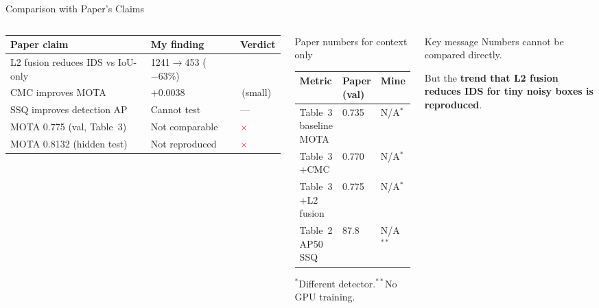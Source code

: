 \documentclass[aspectratio=169, 10pt]{beamer}
\newcommand{\yes}{\textcolor{green!60!black}{\textbf{\checkmark}}}
\newcommand{\no}{\textcolor{red}{\textbf{$\times$}}}
\begin{document}
\begin{frame}{Comparison with Paper's Claims}

  \begin{columns}[T]


    \begin{tabular}{p{3.8cm}p{2.0cm}p{1.0cm}}
      \toprule
      Paper claim & My finding & Verdict \\
      \midrule
      L2 fusion reduces IDS vs IoU-only &
        1241$\to$453 ($-63\%$) & \yes \\
      \addlinespace
      CMC improves MOTA &
        $+0.0038$ & \yes\,\small(small) \\
      \addlinespace
      SSQ improves detection AP &
        Cannot test & --- \\
      \addlinespace
      MOTA 0.775 (val, Table~3) &
        Not comparable & \no \\
      \addlinespace
      MOTA 0.8132 (hidden test) &
        Not reproduced & \no \\
      \bottomrule
    \end{tabular}

    \vspace{0.8em}
    \begin{block}{Paper numbers for context only}
      \small
      \begin{tabular}{lll}
        \toprule
        Metric & Paper (val) & Mine \\
        \midrule
        Table~3 baseline MOTA & 0.735 & N/A$^*$ \\
        Table~3 +CMC & 0.770 & N/A$^*$ \\
        Table~3 +L2 fusion & 0.775 & N/A$^*$ \\
        Table~2 AP50 SSQ & 87.8 & N/A$^{**}$ \\
        \bottomrule
      \end{tabular}
      \vspace{0.2em}
      \small$^*$Different detector.\quad$^{**}$No GPU training.
    \end{block}

    \begin{alertblock}{Key message}
      Numbers cannot be compared directly.

      \vspace{0.5em}
      But the \textbf{trend that L2 fusion reduces IDS for tiny noisy boxes is reproduced}.


\end{alertblock}
\end{columns}
\end{frame}
\end{document}

